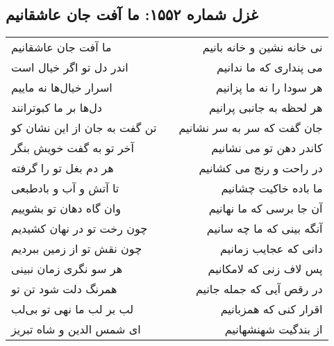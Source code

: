 \begin{center}
\section*{غزل شماره ۱۵۵۲: ما آفت جان عاشقانیم}
\label{sec:1552}
\begin{longtable}{l p{0.5cm} r}
ما آفت جان عاشقانیم
&&
نی خانه نشین و خانه بانیم
\\
اندر دل تو اگر خیال است
&&
می پنداری که ما ندانیم
\\
اسرار خیال‌ها نه ماییم
&&
هر سودا را نه ما پزانیم
\\
دل‌ها بر ما کبوترانند
&&
هر لحظه به جانبی پرانیم
\\
تن گفت به جان از این نشان کو
&&
جان گفت که سر به سر نشانیم
\\
آخر تو به گفت خویش بنگر
&&
کاندر دهن تو می نشانیم
\\
هر دم بغل تو را گرفته
&&
در راحت و رنج می کشانیم
\\
تا آتش و آب و بادطبعی
&&
ما باده خاکیت چشانیم
\\
وان گاه دهان تو بشوییم
&&
آن جا برسی که ما نهانیم
\\
چون رخت تو در نهان کشیدیم
&&
آنگه بینی که ما چه سانیم
\\
چون نقش تو از زمین ببردیم
&&
دانی که عجایب زمانیم
\\
هر سو نگری زمان نبینی
&&
پس لاف زنی که لامکانیم
\\
همرنگ دلت شود تن تو
&&
در رقص آیی که جمله جانیم
\\
لب بر لب ما نهی تو بی‌لب
&&
اقرار کنی که همزبانیم
\\
ای شمس الدین و شاه تبریز
&&
از بندگیت شهنشهانیم
\\
\end{longtable}
\end{center}
